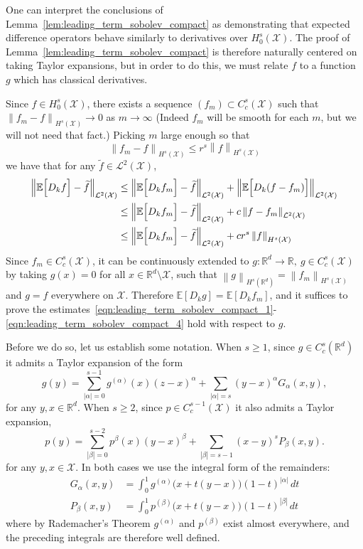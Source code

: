 \documentclass{article}
\newcommand{\Reals}{\mathbb{R}}
\newcommand{\abs}[1]{\left \lvert #1 \right \rvert}
\newcommand{\norm}[1]{\left \lVert #1 \right \rVert}
\newcommand{\1}{\mathbf{1}}
\newcommand{\Rd}{\Reals^d}
\newcommand{\Xset}{\mathcal{X}}
\newcommand{\Leb}{\mathcal{L}}
\newcommand{\Ebb}{\mathbb{E}}
\newcommand{\wt}[1]{\widetilde{#1}}
\theoremstyle{alden}
\theoremstyle{aldenthm}
\theoremstyle{definition}
\theoremstyle{remark}
\begin{document}
One can interpret the conclusions of Lemma~\ref{lem:leading_term_sobolev_compact} as demonstrating that expected difference operators behave similarly to derivatives over $H_0^{s}(\Xset)$. The proof of Lemma~\ref{lem:leading_term_sobolev_compact} is therefore naturally centered on taking Taylor expansions, but in order to do this, we must relate $f$ to a function $g$ which has classical derivatives. 

Since $f \in H_0^s(\Xset)$, there exists a sequence $(f_m) \subset C_c^s(\Xset)$ such that $\norm{f_m - f}_{H^s(\Xset)} \to 0$ as $m \to \infty$ (Indeed $f_m$ will be smooth for each $m$, but we will not need that fact.) Picking $m$ large enough so that
\begin{equation*}
\norm{f_m - f}_{H^s(\Xset)} \leq r^s \norm{f}_{H^s(\Xset)}
\end{equation*}
we have that for any $\wt{f} \in \Leb^2(\Xset)$,
\begin{align*}
\norm{\Ebb\Bigl[D_kf\Bigr] - \wt{f}}_{\Leb^2(\Xset)} & \leq \norm{\Ebb\Bigl[D_kf_m\Bigr] - \wt{f}}_{\Leb^2(\Xset)} + \norm{\Ebb\Bigl[D_k(f - f_m)\Bigr]}_{\Leb^2(\Xset)} \\
& \leq \norm{\Ebb\Bigl[D_kf_m\Bigr] - \wt{f}}_{\Leb^2(\Xset)} + c \norm{f - f_m}_{\Leb^2(\Xset)} \\
& \leq \norm{\Ebb\Bigl[D_kf_m\Bigr] - \wt{f}}_{\Leb^2(\Xset)} + c r^s \norm{f}_{H^s(\Xset)}
\end{align*}
Since $f_m \in C_c^s(\Xset)$, it can be continuously extended to $g: \Rd \to \Reals,~ g \in C_c^s(\Xset)$ by taking $g(x) = 0$ for all $x \in \Rd \setminus \Xset$, such that $\norm{g}_{H^s(\Rd)} = \norm{f_m}_{H^s(\Xset)}$ and $g = f$ everywhere on $\Xset$. Therefore $\Ebb[D_kg] =\Ebb[D_kf_m]$, and it suffices to prove the estimates~\eqref{eqn:leading_term_sobolev_compact_1}-\eqref{eqn:leading_term_sobolev_compact_4} hold with respect to $g$. 

Before we do so, let us establish some notation. When $s \geq 1$, since $g \in C_c^s(\Rd)$ it admits a Taylor expansion of the form
\begin{equation*}
g(y) =  \sum_{\abs{\alpha} = 0}^{s - 1} g^{(\alpha)}(x) (z - x)^{\alpha} + \sum_{\abs{\alpha} = s} (y - x)^{\alpha} G_{\alpha}(x,y),
\end{equation*}
for any $y,x \in \Rd$. When $s \geq 2$, since $p \in C_c^{s - 1}(\Xset)$ it also admits a Taylor expansion,
\begin{equation*}
p(y) = \sum_{\abs{\beta} = 0}^{s - 2} p^{\beta}(x) (y - x)^{\beta} + \sum_{\abs{\beta} = s - 1} (x - y)^s P_{\beta}(x,y).
\end{equation*}
for any $y,x \in \Xset$.
In both cases we use the integral form of the remainders:
\begin{align*}
G_{\alpha}(x,y) & = \int_{0}^{1} g^{(\alpha)}\bigl(x + t(y - x)\bigr)(1 - t)^{\abs{\alpha}} \,dt \\
P_{\beta}(x,y) & = \int_{0}^{1} p^{(\beta)}\bigl(x + t(y - x)\big) (1 - t)^{\abs{\beta}}  \,dt 
\end{align*}
where by Rademacher's Theorem $g^{(\alpha)}$ and $p^{(\beta)}$ exist almost everywhere, and the preceding integrals are therefore well defined.
\end{document}
